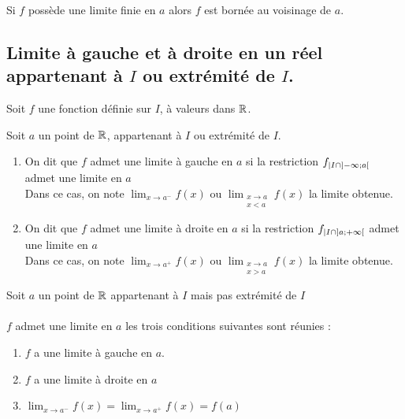 \begin{defprop}
    Si \(f\) possède une limite finie en \(a\) alors \(f\) est bornée au voisinage de \(a\).
\end{defprop}

\subsection{Limite à gauche et à droite en un réel appartenant à \(I\) ou extrémité de \(I\).}

\begin{nota}
    Soit \(f\) une fonction définie sur \(I\), à valeurs dans \(\mathbb{R}\).
\end{nota}
\begin{defi}
    Soit \(a\) un point de \(\mathbb{R}\), appartenant à \(I\) ou extrémité de \(I\).
    \begin{enumerate}
        \item On dit que \(f\) admet une limite à gauche en \(a\) si la restriction \(f_{| I \cap \left]-\infty;a\right[}\) admet une limite en \(a\)\\
        Dans ce cas, on note \(\lim_{x\to a^-}f(x)\)  ou \(\lim_{\substack{x \to a \\ x < a}} f(x)\) la limite obtenue.
        \item On dit que \(f\) admet une limite à droite en \(a\) si la restriction \(f_{| I \cap \left]a;+\infty\right[}\) admet une limite en \(a\)\\
        Dans ce cas, on note \(\lim_{x\to a^+}f(x)\)  ou \(\lim_{\substack{x \to a \\ x > a}} f(x)\) la limite obtenue.
    \end{enumerate}
\end{defi}

\begin{defprop}
    Soit \(a\) un point de \(\mathbb{R}\) appartenant à \(I\) mais pas extrémité de \(I\)\\~\\
    \(f\) admet une limite en \(a\) \ssi les trois conditions suivantes sont réunies :
    \begin{enumerate}
        \item \(f\) a une limite à gauche en \(a\).
        \item \(f\) a une limite à droite en \(a\)
        \item \(\lim_{x\to a^-} f(x) = \lim_{x \to a^+} f(x) = f(a)\)
    \end{enumerate}
\end{defprop}
